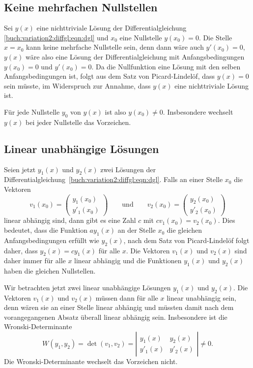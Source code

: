 %
%
\subsection{Keine mehrfachen Nullstellen
\label{buch:variation2:diffgl:subsection:mehrfachenullstellen}}
Sei $y(x)$ eine nichttriviale Lösung der Differentialgleichung
\eqref{buch:variation2:diffgl:eqn:dgl} und $x_0$ eine
Nullstelle $y(x_0)=0$.
Die Stelle $x=x_0$ kann keine mehrfache Nullstelle sein, denn dann
wäre auch $y'(x_0)=0$, $y(x)$ wäre also eine Lösung der Differentialgleichung
mit Anfangsbedingungen $y(x_0)=0$ und $y'(x_0)=0$. 
Da die Nullfunktion eine Lösung mit den selben Anfangsbedingungen ist,
folgt aus dem Satz von Picard-Lindelöf, dass $y(x)=0$ sein müsste, im
Widerspruch zur Annahme, dass $y(x)$ eine nichttriviale Lösung ist.

Für jede Nullstelle $y_0$ von $y(x)$ ist also $y(x_0)\ne 0$.
Insbesondere wechselt $y(x)$ bei jeder Nullstelle das Vorzeichen.


%
%
\subsection{Linear unabhängige Lösungen
\label{buch:variation2:diffgl:subsetion:linunabh}}
Seien jetzt $y_1(x)$ und $y_2(x)$ zwei Lösungen
der Differentialgleichung~\eqref{buch:variation2:diffgl:eqn:dgl}.
Falls an einer Stelle $x_0$ die Vektoren
\[
v_1(x_0)
=
\begin{pmatrix}
y_1(x_0)\\
y'_1(x_0)
\end{pmatrix}
\qquad\text{und}\qquad
v_2(x_0)
=
\begin{pmatrix}
y_2(x_0)\\
y'_2(x_0)
\end{pmatrix}
\]
linear abhängig sind, dann gibt es eine Zahl $c$ mit $cv_1(x_0)=v_2(x_0)$.
Dies bedeutet, dass die Funktion $ay_1(x)$ an der Stelle $x_0$ 
die gleichen Anfangsbedingungen erfüllt wie $y_2(x)$, nach dem
Satz von Picard-Lindelöf folgt daher, dass $y_2(x)=cy_1(x)$ für 
%
alle $x$.
Die Vektoren $v_1(x)$ und $v_2(x)$ sind daher immer für alle
$x$ linear abhängig und die Funktionen $y_1(x)$ und $y_2(x)$ haben
die gleichen Nullstellen.

Wir betrachten jetzt zwei linear unabhängige Lösungen
$y_1(x)$ und $y_2(x)$.
Die Vektoren $v_1(x)$ und $v_2(x)$ müssen dann
für alle $x$ linear unabhängig sein, denn wären sie an einer Stelle
linear abhängig und müssten damit nach dem vorangegangenen Absatz
überall linear abhängig sein.
Insbesondere ist die Wronski-Determinante
%
\[
W(y_1,y_2)
=
\det(v_1,v_2)
=
\left|
\begin{matrix}
 y_1(x) &  y_2(x) \\
y'_1(x) & y'_2(x)
\end{matrix}
\right|
\ne
0.
\]
Die Wronski-Determinante wechselt das Vorzeichen nicht.

